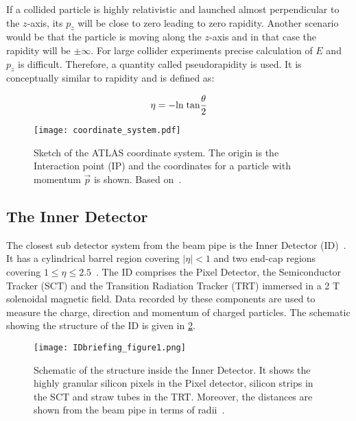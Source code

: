 If a collided particle is highly relativistic and launched almost perpendicular to the $z$-axis, its $p_z$ will be close to zero leading to zero rapidity.
Another scenario would be that the particle is moving along the $z$-axis and in that case the rapidity will be $\pm \infty$. For large
collider experiments precise calculation of $E$ and $p_z$ is difficult. Therefore, a quantity called pseudorapidity is used. It is conceptually similar to 
rapidity and is defined as:

\begin{equation}
    \eta = -\text{ln}\hspace{0.1cm}\text{tan}\frac{\theta}{2}
\end{equation}

\begin{figure}[htbp]
    \centering
    \texttt{[image: coordinate\_system.pdf]}
    \caption[Sketch of the ATLAS coordinate system]{Sketch of the ATLAS coordinate system. 
    The origin is the Interaction point (IP) and the coordinates for a particle 
    with momentum $\vec{p}$ is shown. Based on~\cite{coordinatesys}.}%
    \label{fig:coordinatesys}
\end{figure}

\subsection{The Inner Detector}
The closest sub detector system from the beam pipe is the Inner Detector (ID)~\cite{CERN-LHCC-97-016,IDET-2010-01}. It has a cylindrical 
barrel region covering $|\eta|<1$ and two end-cap regions covering 
$1 \leq \eta \leq 2.5$~\cite{BARBERIS2000331}. The ID comprises the Pixel Detector, the Semiconductor 
Tracker (SCT) and the Transition Radiation Tracker (TRT) immersed in a 2 T solenoidal 
magnetic field. Data recorded by these components are used to measure the charge, direction and 
momentum of charged particles. The schematic showing the structure of the ID is given in \cref{fig:ID}.

\begin{figure}[htbp]
    \centering
    \texttt{[image: IDbriefing\_figure1.png]}
    \caption[Sketch of the ATLAS Inner Detector]{Schematic of the structure inside the Inner
    Detector. It shows the highly granular silicon pixels in the Pixel detector, silicon strips in the
    SCT and straw tubes in the TRT. Moreover, the distances are shown from the beam pipe in 
    terms of radii~\cite{Collaboration:2723878}.}%
    \label{fig:ID}
\end{figure}


